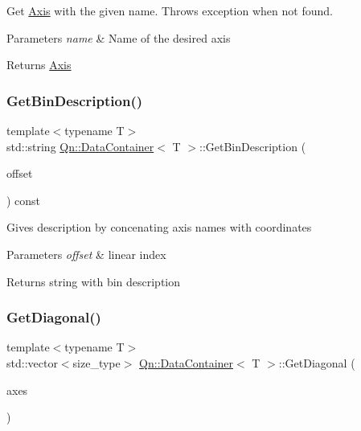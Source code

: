 Get \mbox{\hyperlink{classQn_1_1Axis}{Axis}} with the given name. Throws exception when not found. 
\begin{DoxyParams}{Parameters}
{\em name} & Name of the desired axis \\
\hline
\end{DoxyParams}
\begin{DoxyReturn}{Returns}
\mbox{\hyperlink{classQn_1_1Axis}{Axis}} 
\end{DoxyReturn}
\mbox{\label{classQn_1_1DataContainer_a50ede53a78fd13dfa1cf4bad0b04babc}} 
\subsubsection{\texorpdfstring{Get\+Bin\+Description()}{GetBinDescription()}}
{\footnotesize\ttfamily template$<$typename T$>$ \\
std\+::string \mbox{\hyperlink{classQn_1_1DataContainer}{Qn\+::\+Data\+Container}}$<$ T $>$\+::Get\+Bin\+Description (\begin{DoxyParamCaption}\item[{const unsigned long}]{offset }\end{DoxyParamCaption}) const\hspace{0.3cm}{\ttfamily [inline]}}

Gives description by concenating axis names with coordinates 
\begin{DoxyParams}{Parameters}
{\em offset} & linear index \\
\hline
\end{DoxyParams}
\begin{DoxyReturn}{Returns}
string with bin description 
\end{DoxyReturn}
\mbox{\label{classQn_1_1DataContainer_a5acec0ed294b3225f32981636af698d7}} 
\subsubsection{\texorpdfstring{Get\+Diagonal()}{GetDiagonal()}}
{\footnotesize\ttfamily template$<$typename T$>$ \\
std\+::vector$<$size\+\_\+type$>$ \mbox{\hyperlink{classQn_1_1DataContainer}{Qn\+::\+Data\+Container}}$<$ T $>$\+::Get\+Diagonal (\begin{DoxyParamCaption}\item[{const Qn\+Axes \&}]{axes }\end{DoxyParamCaption})\hspace{0.3cm}{\ttfamily [inline]}}

